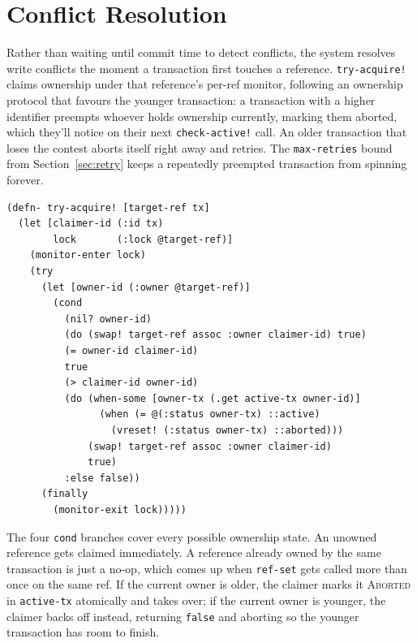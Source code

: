 \section{Conflict Resolution}
\label{sec:conflict-resolution}

Rather than waiting until commit time to detect conflicts, the system
resolves write conflicts the moment a transaction first touches a reference.
\texttt{try-acquire!} claims ownership under that reference's per-ref
monitor, following an ownership protocol that favours the younger
transaction: a transaction with a higher identifier preempts whoever holds
ownership currently, marking them aborted, which they'll notice on
their next \texttt{check-active!} call. An older transaction that loses the
contest aborts itself right away and retries. The \texttt{max-retries} bound
from Section~\ref{sec:retry} keeps a repeatedly preempted transaction from
spinning forever.

\begin{listing}[H]
  \begin{verbatim}
(defn- try-acquire! [target-ref tx]
  (let [claimer-id (:id tx)
        lock       (:lock @target-ref)]
    (monitor-enter lock)
    (try
      (let [owner-id (:owner @target-ref)]
        (cond
          (nil? owner-id)
          (do (swap! target-ref assoc :owner claimer-id) true)
          (= owner-id claimer-id)
          true
          (> claimer-id owner-id)
          (do (when-some [owner-tx (.get active-tx owner-id)]
                (when (= @(:status owner-tx) ::active)
                  (vreset! (:status owner-tx) ::aborted)))
              (swap! target-ref assoc :owner claimer-id)
              true)
          :else false))
      (finally
        (monitor-exit lock)))))
\end{verbatim}
  \caption{Ownership acquisition. Younger transactions preempt the older
    owner, which aborts and retries.}
  \label{lst:try-acquire}
\end{listing}

The four \texttt{cond} branches cover every possible ownership state. An
unowned reference gets claimed immediately. A reference already owned by the
same transaction is just a no-op, which comes up when \texttt{ref-set} gets
called more than once on the same ref. If the current owner is older, the
claimer marks it \textsc{Aborted} in \texttt{active-tx} atomically and takes
over; if the current owner is younger, the claimer backs off instead,
returning \texttt{false} and aborting so the younger transaction has room to
finish.

